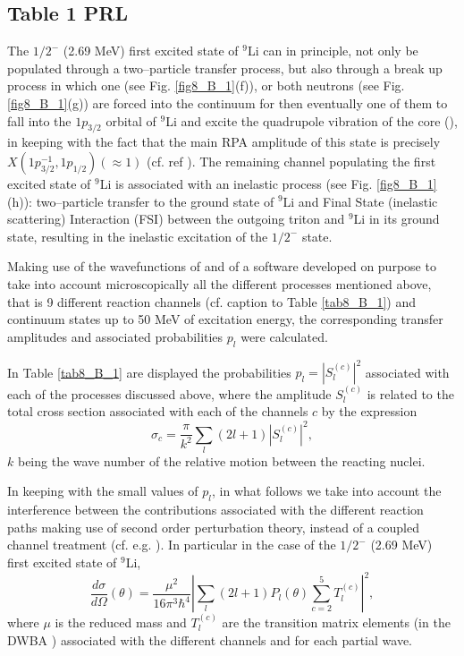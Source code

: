 \begin{subappendices}
\section{Table 1 PRL}\label{C8AppB}
The $1/2^-$ (2.69 MeV) first excited state of $^9$Li can in principle, not only be populated through a two--particle transfer process, but also through a break up process in which one (see Fig. \ref{fig8_B_1}(f)), or both neutrons (see Fig. \ref{fig8_B_1}(g)) are forced into the continuum for then eventually one of them to fall into the $1p_{3/2}$ orbital of $^9$Li and excite the quadrupole vibration of the core (\cite{Potel:10}), in keeping with the fact that the main RPA amplitude of this state is precisely $X(1p^{-1}_{3/2},1p_{1/2})(\approx 1)$ (cf. ref \cite{Barranco:01}). The remaining channel populating the first excited state of $^9$Li is associated with an inelastic process (see Fig. \ref{fig8_B_1}(h)): two--particle transfer to the ground state of $^{9}$Li and Final State (inelastic scattering) Interaction (FSI) between the outgoing triton and $^{9}$Li in its ground state, resulting in the inelastic excitation of  the $1/2^-$ state.


Making use of the wavefunctions of  \cite{Barranco:01} and of a software developed on purpose to take into account microscopically all the different processes mentioned above, that is 9 different reaction channels (cf. caption to Table \ref{tab8_B_1}) and continuum states up to 50 MeV of excitation energy, the corresponding transfer amplitudes and associated probabilities $p_l$ were calculated.


 In Table \ref{tab8_B_1} are displayed the probabilities $p_l=|S_l^{(c)}|^2$ associated with each of the processes discussed above, where the amplitude $S_l^{(c)}$ is related to the total cross section associated with each of the channels $c$  by the expression \citep{Satchler:80,Landau:81}
\begin{equation}\label{eq6}
    \sigma_c=\frac{\pi}{k^2}\sum_l(2l+1)|S_l^{(c)}|^2,
\end{equation}
$k$ being the wave number of the relative motion between the reacting nuclei.



 In keeping with the small values of $p_l$, in what follows we take into account the interference between the contributions associated with the different reaction paths making use of second order perturbation theory, instead of a coupled channel treatment (cf. e.g.  \cite{Ascuitto:69} \cite{Tamura:70} \cite{Khoa:04} \cite{Keeley:07b} \cite{Thompson:88}). In particular in the case of the $1/2^-$ (2.69 MeV) first excited state of $^9$Li,
\begin{equation}
    \frac{d\sigma}{d\Omega}(\theta)=\frac{\mu^2}{16\pi^3\hbar^4}\left|\sum_l(2l+1)P_l(\theta)\sum_{c=2}^5 T^{(c)}_l\right|^2,
\end{equation}
where $\mu$ is the reduced mass and $T^{(c)}_l$ are the transition matrix elements (in the DWBA \cite{Satchler:80}) associated with the different channels and for each partial wave.


\end{subappendices}
